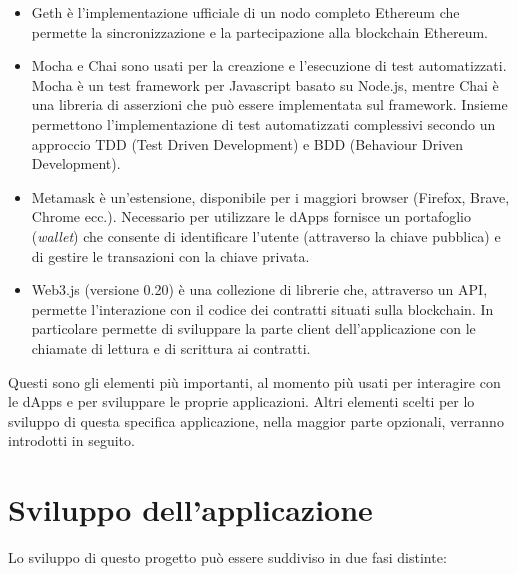 \begin{itemize}
Truffle fornisce anche il codice \emph{boilerplate} ragruppato in diversi pacchetti chiamati "boxes" utili per uno sviluppo accelerato\footnote{Come base di questo progetto si è scelto il pacchetto chiamato pet-shop disponibile su https://truffleframework.com/boxes/pet-shop}.

\item Geth è l'implementazione ufficiale di un nodo completo Ethereum che permette la sincronizzazione e la partecipazione alla blockchain Ethereum.

\item Mocha e Chai sono usati per la creazione e l'esecuzione di test automatizzati. Mocha è un test framework per Javascript basato su Node.js, mentre Chai è una libreria di asserzioni che può essere implementata sul framework. Insieme permettono l'implementazione di test automatizzati complessivi secondo un approccio TDD (Test Driven Development) e BDD (Behaviour Driven Development).

\item Metamask è un’estensione, disponibile per i maggiori browser (Firefox, Brave, Chrome ecc.). Necessario per utilizzare le dApps fornisce un portafoglio (\emph{wallet}) che consente di identificare l'utente (attraverso la chiave pubblica) e di gestire le transazioni con la chiave privata.

\item Web3.js (versione 0.20) è una collezione di librerie che, attraverso un API, permette l'interazione con il codice dei contratti situati sulla blockchain. In particolare permette di sviluppare la parte client dell'applicazione con le chiamate di lettura e di scrittura ai contratti.

\end{itemize}

Questi sono gli elementi più importanti, al momento più usati per interagire con le dApps e per sviluppare le proprie applicazioni. Altri elementi scelti per lo sviluppo di questa specifica applicazione, nella maggior parte opzionali, verranno introdotti in seguito.

\section{Sviluppo dell'applicazione}

Lo sviluppo di questo progetto può essere suddiviso in due fasi distinte:

